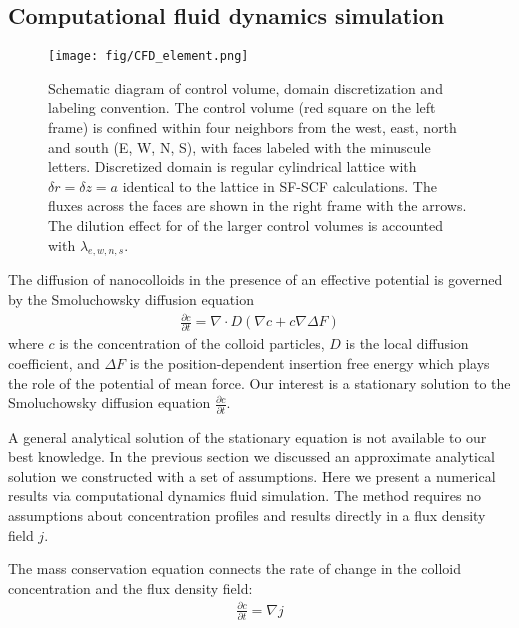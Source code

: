 \documentclass[10pt, a4paper]{article}
\begin{document}
\subsection*{Computational fluid dynamics simulation}

\begin{multicols}{2}
\begin{figure}[H]
    \centering
    \texttt{[image: fig/CFD\_element.png]}
    \caption{
        Schematic diagram of control volume, domain discretization and labeling convention.
        The control volume (red square on the left frame) is confined within four neighbors from the west, east, north and south (E, W, N, S), with faces labeled with the minuscule letters.
        Discretized domain is regular cylindrical lattice with $\delta r = \delta z = a$ identical to the lattice in SF-SCF calculations.
        The fluxes across the faces are shown in the right frame with the arrows.
        The dilution effect for of the larger control volumes is accounted with $\lambda_{e,w,n,s}$.
        }
    \label{fig:CFD_element}
\end{figure}

The diffusion of nanocolloids in the presence of an effective potential is governed by the Smoluchowsky diffusion equation
\begin{eqnarray}
    \frac{\partial c}{\partial t} = \nabla \cdot D(\nabla c + c \nabla \Delta F)
\end{eqnarray} where $c$ is the concentration of the colloid particles,
$D$ is the local diffusion coefficient, and $\Delta F$ is the position-dependent insertion free energy which plays the role of the potential of mean force.
Our interest is a stationary solution to the Smoluchowsky diffusion equation $\frac{\partial c}{\partial t}$.

A general analytical solution of the stationary equation is not available to our best knowledge. 
In the previous section we discussed an approximate analytical solution we constructed with a set of assumptions.
Here we present a numerical results via computational dynamics fluid simulation.
The method requires no assumptions about concentration profiles and results directly in a flux density field $j$.

The mass conservation equation connects the rate of change in the colloid concentration and the flux density field:
\begin{eqnarray}
    \frac{\partial c}{\partial t} = \nabla j
\end{eqnarray}


\end{multicols}
\end{document}
